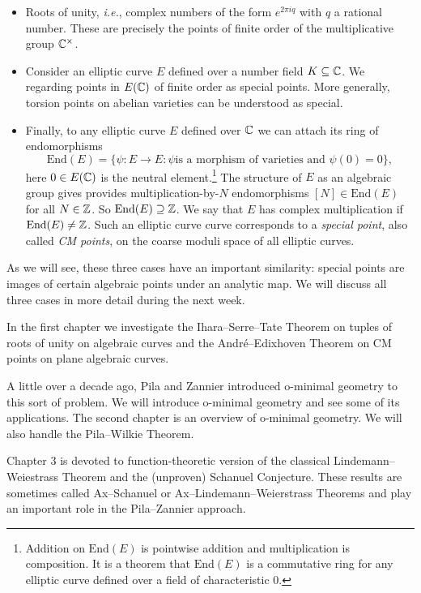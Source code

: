 \begin{itemize}
\item Roots of unity, \textit{i.e.}, complex numbers of the form
  $e^{2\pi i q}$ with $q$ a rational number. These are precisely the
  points of finite order of the multiplicative group ${\mathbb{C}}^\times$. 

\item Consider an elliptic curve $E$ defined over a number field
  $K\subseteq{\mathbb{C}}$. We regarding points in $E({\mathbb{C}})$ of finite order as
  special points. More generally, torsion points on abelian varieties
  can be understood as special.

\item Finally, to any elliptic curve $E$ defined over ${\mathbb{C}}$ we can
  attach its ring of endomorphisms
  $$\mathrm{End}(E) = \{\psi \colon E\rightarrow E : \psi\text{
    is a morphism of varieties and }\psi(0)=0\},$$
  here $0\in E({\mathbb{C}})$ is the neutral element.\footnote{Addition on
    $\mathrm{End}(E)$ is pointwise addition and multiplication is
    composition. It is a theorem that $\mathrm{End}(E)$ is a
    commutative ring for any elliptic curve defined over a field of
    characteristic $0$.}
  The  structure of $E$ as an algebraic group gives provides
  multiplication-by-$N$ endomorphisms $[N] \in \mathrm{End}(E)$ for
  all $N\in{\mathbb{Z}}$. So $\mathrm{End}(E) \supseteq {\mathbb{Z}}$.
  We say that $E$ has complex multiplication if
  $\mathrm{End}(E)\not={\mathbb{Z}}$.
  Such an elliptic curve curve corresponds to a \textit{special
    point}, also called \textit{CM points},
  on the coarse moduli space of all elliptic curves.   
\end{itemize}

As we will see, these three cases have an important similarity: special
points are images of certain algebraic points under an analytic map.
We will discuss all three cases in more detail during the next week. 

In the first chapter we investigate the Ihara--Serre--Tate Theorem on
tuples of roots of unity on algebraic curves and the
Andr\'e--Edixhoven Theorem on CM points on plane algebraic curves.

A little over a decade ago, Pila and Zannier introduced o-minimal
geometry to this sort of problem. We will introduce o-minimal geometry
and see some of its applications. The second chapter is an overview of
o-minimal geometry. We will also handle the Pila--Wilkie Theorem.

Chapter 3 is devoted to function-theoretic version of the classical
Lindemann--Weiestrass Theorem and the (unproven) Schanuel Conjecture.
These results are sometimes called Ax--Schanuel or
Ax--Lindemann--Weierstrass Theorems and play an important role in the
Pila--Zannier approach.

